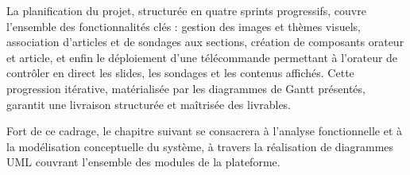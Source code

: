 La planification du projet, structurée en quatre sprints progressifs, couvre l'ensemble des
fonctionnalités clés : gestion des images et thèmes visuels, association d'articles et de
sondages aux sections, création de composants orateur et article, et enfin le déploiement
d'une télécommande permettant à l'orateur de contrôler en direct les slides, les sondages
et les contenus affichés. Cette progression itérative, matérialisée par les diagrammes de
Gantt présentés, garantit une livraison structurée et maîtrisée des livrables.

Fort de ce cadrage, le chapitre suivant se consacrera à l'analyse fonctionnelle et à la
modélisation conceptuelle du système, à travers la réalisation de diagrammes UML couvrant
l'ensemble des modules de la plateforme.

